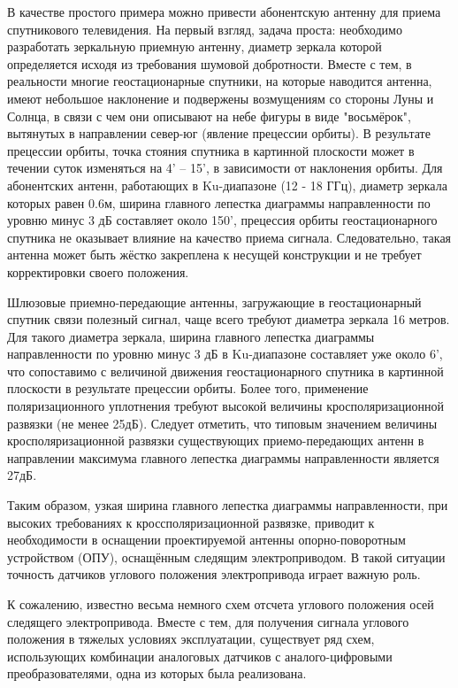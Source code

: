 В качестве простого примера можно привести абонентскую антенну для приема спутникового телевидения. 
На первый взгляд, задача проста: необходимо разработать зеркальную приемную антенну, диаметр зеркала которой определяется исходя из требования шумовой добротности. 
Вместе с тем, в реальности многие геостационарные спутники, на которые наводится антенна, имеют небольшое наклонение и подвержены возмущениям со 
стороны Луны и Солнца, 
в связи с чем они описывают на небе фигуры в виде "восьмёрок", вытянутых в направлении север-юг (явление прецессии орбиты). 
В результате прецессии орбиты, точка стояния спутника в картинной плоскости может в течении суток изменяться на 4' – 15', в зависимости от наклонения орбиты. 
Для абонентских антенн, работающих в Ku-диапазоне (12 - 18 ГГц), диаметр зеркала которых равен 0.6м, ширина главного лепестка диаграммы направленности 
по уровню минус 3 дБ составляет около 150', 
прецессия орбиты геостационарного спутника не оказывает влияние на качество приема сигнала. Следовательно, такая антенна может быть жёстко закреплена к несущей конструкции 
и не требует корректировки своего положения. 

Шлюзовые приемно-передающие антенны, загружающие в геостационарный спутник связи полезный сигнал, чаще всего требуют диаметра зеркала 16 метров. 
Для такого диаметра зеркала, ширина главного лепестка диаграммы направленности по уровню минус 3 дБ в Ku-диапазоне составляет уже около 6', 
что сопоставимо с величиной движения геостационарного спутника в картинной плоскости в результате прецессии орбиты. 
Более того, применение поляризационного уплотнения требуют высокой величины кросполяризационной развязки (не менее 25дБ). 
Следует отметить, что типовым значением величины кросполяризационной развязки существующих приемо-передающих антенн 
в направлении максимума главного лепестка диаграммы направленности является 27дБ. 

Таким образом, узкая ширина главного лепестка диаграммы направленности, при высоких требованиях к кроссполяризационной развязке, 
приводит к необходимости в оснащении проектируемой антенны опорно-поворотным устройством (ОПУ), оснащённым следящим электроприводом.  
В такой ситуации точность датчиков углового положения электропривода играет важную роль.  

К сожалению, известно весьма немного схем отсчета углового положения осей следящего электропривода. Вместе с тем, для получения сигнала углового положения в 
тяжелых условиях эксплуатации, существует ряд схем, использующих комбинации аналоговых датчиков с аналого-цифровыми преобразователями, 
одна из которых была реализована.

